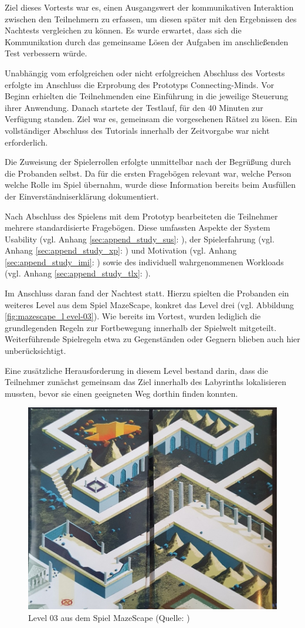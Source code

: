 Ziel dieses Vortests war es, einen Ausgangswert der kommunikativen Interaktion zwischen den Teilnehmern zu erfassen, um diesen später mit den Ergebnissen des Nachtests vergleichen zu können. Es wurde erwartet, dass sich die Kommunikation durch das gemeinsame Lösen der Aufgaben im anschließenden Test verbessern würde.

Unabhängig vom erfolgreichen oder nicht erfolgreichen Abschluss des Vortests erfolgte im Anschluss die Erprobung des Prototyps Connecting-Minds. Vor Beginn erhielten die Teilnehmenden eine Einführung in die jeweilige Steuerung ihrer Anwendung. Danach startete der Testlauf, für den 40 Minuten zur Verfügung standen. Ziel war es, gemeinsam die vorgesehenen Rätsel zu lösen. Ein vollständiger Abschluss des Tutorials innerhalb der Zeitvorgabe war nicht erforderlich.

Die Zuweisung der Spielerrollen erfolgte unmittelbar nach der Begrüßung durch die Probanden selbst. Da für die ersten Fragebögen relevant war, welche Person welche Rolle im Spiel übernahm, wurde diese Information bereits beim Ausfüllen der Einverständniserklärung dokumentiert.

Nach Abschluss des Spielens mit dem Prototyp bearbeiteten die Teilnehmer mehrere standardisierte Fragebögen. Diese umfassten Aspekte der System Usability (vgl. Anhang \ref{sec:append_study_sus}: ), der Spielerfahrung (vgl. Anhang \ref{sec:append_study_xp}: ) und Motivation (vgl. Anhang \ref{sec:append_study_imi}: ) sowie des individuell wahrgenommenen Workloads (vgl. Anhang \ref{sec:append_study_tlx}: ).

Im Anschluss daran fand der Nachtest statt. Hierzu spielten die Probanden ein weiteres Level aus dem Spiel MazeScape, konkret das Level drei (vgl. Abbildung \ref{fig:mazescape_l evel-03}). Wie bereits im Vortest, wurden lediglich die grundlegenden Regeln zur Fortbewegung innerhalb der Spielwelt mitgeteilt. Weiterführende Spielregeln etwa zu Gegenständen oder Gegnern blieben auch hier unberücksichtigt.

Eine zusätzliche Herausforderung in diesem Level bestand darin, dass die Teilnehmer zunächst gemeinsam das Ziel innerhalb des Labyrinths lokalisieren mussten, bevor sie einen geeigneten Weg dorthin finden konnten.

\begin{figure}[ht]
\centering
\includegraphics[width=0.5\linewidth]{content/pictures/MazeScape_Level03.jpg}
\caption{Level 03 aus dem Spiel MazeScape (Quelle: \citealp{cespedes_mazescape_2023})}
\label{fig:mazescape_level-03}
\end{figure}


